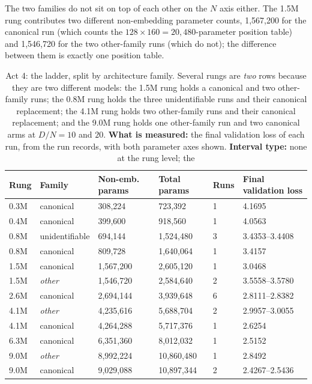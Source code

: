 \documentclass[11pt,a4paper]{article}
\begin{document}
The two families do not sit on top of each other on the $N$ axis either. The
1.5M rung contributes two different non-embedding parameter counts, 1,567,200
for the canonical run (which counts the $128 \times 160 = 20{,}480$-parameter
position table) and 1,546,720 for the two other-family runs (which do not);
the difference between them is exactly one position table.

\begin{table}[H]
\centering
\begin{tabular}{L{1.2cm}L{2.3cm}R{2.5cm}R{2.5cm}R{1.1cm}R{2.9cm}}
\toprule
Rung & Family & Non-emb. params & Total params & Runs & Final validation loss \\
\midrule
0.3M & canonical & 308,224 & 723,392 & 1 & 4.1695 \\
0.4M & canonical & 399,600 & 918,560 & 1 & 4.0563 \\
0.8M & unidentifiable & 694,144 & 1,524,480 & 3 & 3.4353--3.4408 \\
0.8M & canonical & 809,728 & 1,640,064 & 1 & 3.4157 \\
1.5M & canonical & 1,567,200 & 2,605,120 & 1 & 3.0468 \\
1.5M & \emph{other} & 1,546,720 & 2,584,640 & 2 & 3.5558--3.5780 \\
2.6M & canonical & 2,694,144 & 3,939,648 & 6 & 2.8111--2.8382 \\
4.1M & \emph{other} & 4,235,616 & 5,688,704 & 2 & 2.9957--3.0055 \\
4.1M & canonical & 4,264,288 & 5,717,376 & 1 & 2.6254 \\
6.3M & canonical & 6,351,360 & 8,012,032 & 1 & 2.5152 \\
9.0M & \emph{other} & 8,992,224 & 10,860,480 & 1 & 2.8492 \\
9.0M & canonical & 9,029,088 & 10,897,344 & 2 & 2.4267--2.5436 \\
\bottomrule
\end{tabular}
\caption{Act 4: the ladder, split by architecture family. Several rungs are
\emph{two} rows because they are two different models: the 1.5M rung holds a
canonical and two other-family runs; the 0.8M rung holds the three
unidentifiable runs and their canonical replacement; the 4.1M rung holds two
other-family runs and their canonical replacement; and the 9.0M rung holds one
other-family run and two canonical arms at $D/N = 10$ and $20$.
\textbf{What is measured:}
the final validation loss of each run, from the run records, with both
parameter axes shown. \textbf{Interval type:} none at the rung level; the
}
\end{table}
\end{document}
